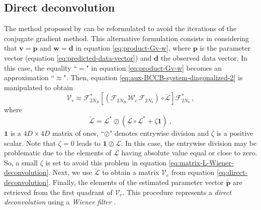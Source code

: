\documentclass[utf8]{FrontiersinHarvard} %
\begin{document}
	\subsection{Direct deconvolution}
	
	The method proposed by \citet{takahashi-etal2020, takahashi-etal2022} can be reformulated to avoid the iterations 
	of the conjugate gradient method.
	This alternative formulation consists in considering that $\mathbf{v} = \mathbf{p}$ and 
	$\mathbf{w} = \mathbf{d}$ in equation \ref{eq:product-Gv-w}, where $\mathbf{p}$ is the parameter vector (equation \ref{eq:predicted-data-vector})
	and $\mathbf{d}$ the observed data vector.
	In this case, the equality ``$=$" in equation \ref{eq:product-Gv-w} becomes an approximation ``$\approx$".
	Then, equation \ref{eq:aux-BCCB-system-diagonalized-2} is manipulated to obtain
	\begin{equation}
		\boldsymbol{\mathcal{V}}_{c} \approx 
		\boldsymbol{\mathcal{F}}_{2N_{B}}^{\ast} 
		\left[ \left( \boldsymbol{\mathcal{F}}_{2N_{B}} \, \boldsymbol{\mathcal{W}}_{c} \, \boldsymbol{\mathcal{F}}_{2N_{b}} \right)
		\circ \breve{\boldsymbol{\mathcal{L}}} \right] \boldsymbol{\mathcal{F}}_{2N_{b}}^{\ast} \: ,
		\label{eq:direct-deconvolution}
	\end{equation}
	where
	\begin{equation}
		\breve{\boldsymbol{\mathcal{L}}} = 
		\boldsymbol{\mathcal{L}}^{\ast} \oslash \left( \boldsymbol{\mathcal{L}} \circ \boldsymbol{\mathcal{L}}^{\ast} + \zeta \mathbf{1} \right) \: ,
		\label{eq:matrix-L-Wiener-deconvolution}
	\end{equation}
	$\mathbf{1}$ is a $4D \times 4D$ matrix of ones, ``$\oslash$" denotes entrywise division and 
	$\zeta$ is a positive scalar.
	Note that $\zeta = 0$ leads to $\mathbf{1} \oslash \boldsymbol{\mathcal{L}}$.
	In this case, the entrywise division may be problematic due to the elements of $\boldsymbol{\mathcal{L}}$ 
	having absolute value equal or close to zero. So, a small $\zeta$ is set to avoid this problem
	in equation \ref{eq:matrix-L-Wiener-deconvolution}.
	Next, we use $\breve{\boldsymbol{\mathcal{L}}}$ to obtain a matrix $\boldsymbol{\mathcal{V}}_{c}$ from equation \ref{eq:direct-deconvolution}.
	Finally, the elements of the estimated parameter vector $\tilde{\mathbf{p}}$ are retrieved from the first
	quadrant of $\boldsymbol{\mathcal{V}}_{c}$.
	This procedure represents a \textit{direct deconvolution} \citep[e.g.,][p. 220]{aster_etal2019}
	using a \textit{Wiener filter} \citep[e.g.,][p. 263]{gonzalez-woods2002}.
	
\end{document}
